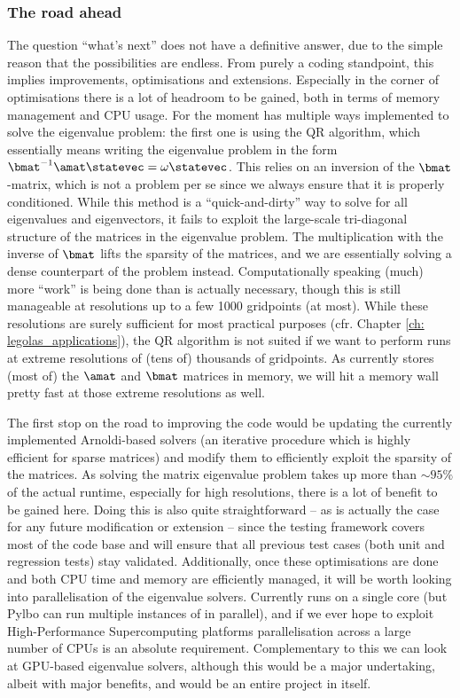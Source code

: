 \subsubsection{The road ahead}
The question ``what's next'' does not have a definitive answer, due to the simple reason that the possibilities are endless. From purely a coding standpoint, this implies improvements, optimisations and extensions. Especially in the corner of optimisations there is a lot of headroom to be gained, both in terms of memory management and CPU usage. For the moment {\legolas} has multiple ways implemented to solve the eigenvalue problem: the first one is using the QR algorithm, which essentially means writing the eigenvalue problem in the form $\bmat^{-1}\amat\statevec = \omega\statevec$. This relies on an inversion of the $\bmat$-matrix, which is not a problem per se since we always ensure that it is properly conditioned. While this method is a ``quick-and-dirty'' way to solve for all eigenvalues and eigenvectors, it fails to exploit the large-scale tri-diagonal structure of the matrices in the eigenvalue problem. The multiplication with the inverse of $\bmat$ lifts the sparsity of the matrices, and we are essentially solving a dense counterpart of the problem instead. Computationally speaking (much) more ``work'' is being done than is actually necessary, though this is still manageable at resolutions up to a few 1000 gridpoints (at most). While these resolutions are surely sufficient for most practical purposes (cfr. Chapter \ref{ch: legolas_applications}), the QR algorithm is not suited if we want to perform runs at extreme resolutions of (tens of) thousands of gridpoints. As {\legolas} currently stores (most of) the $\amat$ and $\bmat$ matrices in memory, we will hit a memory wall pretty fast at those extreme resolutions as well.

The first stop on the road to improving the code would be updating the currently implemented Arnoldi-based solvers (an iterative procedure which is highly efficient for sparse matrices) and modify them to efficiently exploit the sparsity of the matrices. As solving the matrix eigenvalue problem takes up more than $\sim 95\%$ of the actual runtime, especially for high resolutions, there is a lot of benefit to be gained here. Doing this is also quite straightforward -- as is actually the case for any future modification or extension -- since the testing framework covers most of the code base and will ensure that all previous test cases (both unit and regression tests) stay validated. Additionally, once these optimisations are done and both CPU time and memory are efficiently managed, it will be worth looking into parallelisation of the eigenvalue solvers. Currently {\legolas} runs on a single core (but \textsf{Pylbo} can run multiple instances of {\legolas} in parallel), and if we ever hope to exploit High-Performance Supercomputing platforms parallelisation across a large number of CPUs is an absolute requirement. Complementary to this we can look at GPU-based eigenvalue solvers, although this would be a major undertaking, albeit with major benefits, and would be an entire project in itself.

